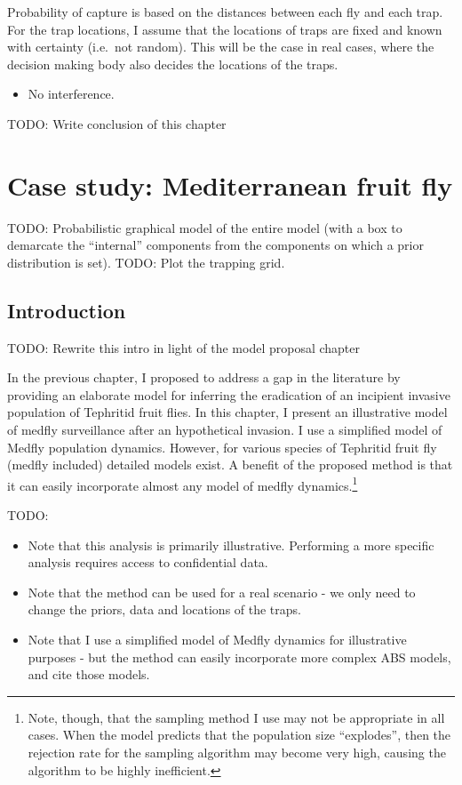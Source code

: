 \documentclass[
]{book}
\providecommand{\tightlist}{%
  \setlength{\itemsep}{0pt}\setlength{\parskip}{0pt}}
\begin{document}
Probability of capture is based on the distances between each fly and each trap. For the trap locations, I assume that the locations of traps are fixed and known with certainty (i.e.~not random). This will be the case in real cases, where the decision making body also decides the locations of the traps.

\begin{itemize}
\tightlist
\item
  No interference.
\end{itemize}

TODO: Write conclusion of this chapter

\hypertarget{case-study-mediterranean-fruit-fly}{%
\chapter{Case study: Mediterranean fruit fly}\label{case-study-mediterranean-fruit-fly}}

TODO: Probabilistic graphical model of the entire model (with a box to demarcate the ``internal'' components from the components on which a prior distribution is set).
TODO: Plot the trapping grid.

\hypertarget{introduction-1}{%
\section{Introduction}\label{introduction-1}}

TODO: Rewrite this intro in light of the model proposal chapter

In the previous chapter, I proposed to address a gap in the literature by providing an elaborate model for inferring the eradication of an incipient invasive population of Tephritid fruit flies. In this chapter, I present an illustrative model of medfly surveillance after an hypothetical invasion. I use a simplified model of Medfly population dynamics. However, for various species of Tephritid fruit fly (medfly included) detailed models exist. A benefit of the proposed method is that it can easily incorporate almost any model of medfly dynamics.\footnote{Note, though, that the sampling method I use may not be appropriate in all cases. When the model predicts that the population size ``explodes'', then the rejection rate for the sampling algorithm may become very high, causing the algorithm to be highly inefficient.}

TODO:

\begin{itemize}
\tightlist
\item
  Note that this analysis is primarily illustrative. Performing a more specific analysis requires access to confidential data.
\item
  Note that the method can be used for a real scenario - we only need to change the priors, data and locations of the traps.
\item
  Note that I use a simplified model of Medfly dynamics for illustrative purposes - but the method can easily incorporate more complex ABS models, and cite those models.
\end{itemize}
\end{document}
